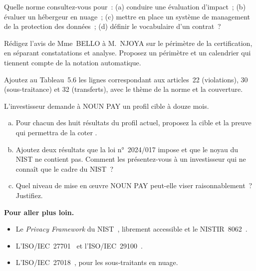 \begin{boxexo}[title={\ding{45}\quad Exercice~5.1. Quelle norme \niveaubase}]
Quelle norme consultez-vous pour~: (a) conduire une évaluation d'impact~;
(b) évaluer un hébergeur en nuage~; (c) mettre en place un système de
management de la protection des données~; (d) définir le vocabulaire d'un
contrat~?
\end{boxexo}

\begin{boxexo}[title={\ding{45}\quad Exercice~5.2. Le périmètre de NOUN PAY \niveaumoyen}]
Rédigez l'avis de Mme~BELLO à M.~NJOYA sur le périmètre de la
certification, en séparant constatations et analyse. Proposez un périmètre
et un calendrier qui tiennent compte de la notation automatique.
\end{boxexo}

\begin{boxexo}[title={\ding{45}\quad Exercice~5.3. Compléter la correspondance \niveaumoyen}]
Ajoutez au Tableau~5.6 les lignes correspondant aux articles~22
(violations), 30 (sous-traitance) et 32 (transferts), avec le thème de la
norme et la couverture.
\end{boxexo}

\begin{boxexo}[title={\ding{45}\quad Exercice~5.4. Le profil cible \niveauexpert}]
L'investisseur demande à NOUN PAY un profil cible à douze mois.
\begin{enumerate}[(a)]
    \item Pour chacun des huit résultats du profil actuel, proposez la cible
          et la preuve qui permettra de la coter \OUI{}.
    \item Ajoutez deux résultats que la loi n°~2024/017 impose et que le
          noyau du NIST ne contient pas. Comment les présentez-vous à un
          investisseur qui ne connaît que le cadre du NIST~?
    \item Quel niveau de mise en œuvre NOUN PAY peut-elle viser
          raisonnablement~? Justifiez.
\end{enumerate}
\end{boxexo}

\bigskip

\begin{boxinfo}
\textbf{Pour aller plus loin.}
\begin{itemize}
    \item Le \textit{Privacy Framework} du NIST~\cite{nist2020pf}, librement
          accessible et le NISTIR~8062~\cite{nistir8062}.
    \item L'ISO/IEC~27701~\cite{iso27701} et l'ISO/IEC~29100~\cite{iso29100}.
    \item L'ISO/IEC~27018~\cite{iso27018}, pour les sous-traitants en nuage.
\end{itemize}
\end{boxinfo}


